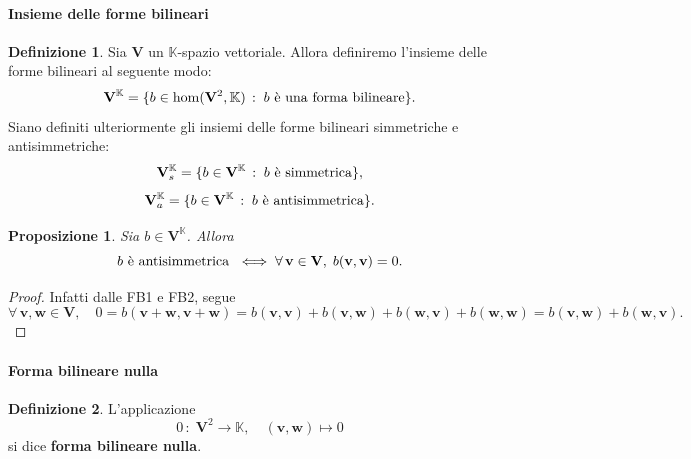 \documentclass{article}
\theoremstyle{plain}
\newtheorem{prop}[thm]{Proposizione}
\theoremstyle{definition}
\newtheorem{defn}{Definizione}[section]
\theoremstyle{remark}
\begin{document}
\paragraph{Insieme delle forme bilineari}
\begin{bxthm}
\begin{defn}
    Sia $\mathbf{V}$ un $\mathbb{K}$-spazio vettoriale. Allora definiremo l'insieme delle forme bilineari al seguente modo:
    \[ \mathbf{V}^{\mathbb{K}}=\{b\in\hom(\mathbf{V}^2,\mathbb{K})\,:\;b \textup{ è una forma bilineare}\}.\]
    Siano definiti ulteriormente gli insiemi delle forme bilineari simmetriche e antisimmetriche:
    \[ \mathbf{V}_s^{\mathbb{K}}=\{b\in\mathbf{V}^{\mathbb{K}}\,:\;b \textup{ è simmetrica}\},\]
    \[ \mathbf{V}_a^{\mathbb{K}}=\{b\in\mathbf{V}^{\mathbb{K}}\,:\;b \textup{ è antisimmetrica}\}.\]
\end{defn}
\end{bxthm}

\vspace{10pt}

\begin{bxthm}
\begin{prop}\label{formbilnull}
    Sia $b\in\mathbf{V}^{\mathbb{K}}$. Allora
    \[b\textup{ è antisimmetrica }\iff \forall\,\mathbf{v}\in\mathbf{V},\;b(\mathbf{v},\mathbf{v})=0.\]
\end{prop}
\end{bxthm}
\begin{proof}
    Infatti dalle FB1 e FB2, segue
    \[\forall\,\mathbf{v},\mathbf{w}\in\mathbf{V},\quad0=b(\mathbf{v}+\mathbf{w},\mathbf{v}+\mathbf{w})=b(\mathbf{v},\mathbf{v})+b(\mathbf{v},\mathbf{w})+b(\mathbf{w},\mathbf{v})+b(\mathbf{w},\mathbf{w})=b(\mathbf{v},\mathbf{w})+b(\mathbf{w},\mathbf{v}).\]
\end{proof}

\vspace{10pt}

\paragraph{Forma bilineare nulla}
\begin{bxthm}
\begin{defn}
L'applicazione 
\[\mathit{0}\,:\;\mathbf{V}^2\to\mathbb{K},\quad (\mathbf{v},\mathbf{w})\mapsto0\]
si dice \textbf{forma bilineare nulla}.    
\end{defn}
\end{bxthm}

\vspace{10pt}
\end{document}
